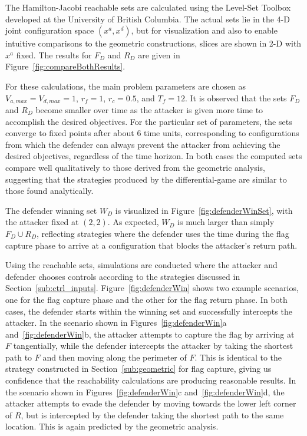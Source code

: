 \documentclass[letterpaper, 10 pt, conference]{ieeeconf}  %
\numberwithin{algorithm}{section}
\begin{document}
The Hamilton-Jacobi reachable sets are calculated using the Level-Set Toolbox~\cite{LSToolbox} developed at the University of British Columbia.  The actual sets lie in the 4-D joint configuration space $(x^a,x^d)$, but for visualization and also to enable intuitive comparisons to the geometric constructions, slices are shown in 2-D with $x^a$ fixed.  The results for $F_D$ and $R_D$ are given in Figure~\ref{fig:compareBothResults}.

For these calculations, the main problem parameters are chosen as $V_{a,max}=V_{d,max}=1$, $r_f = 1$, $r_c = 0.5$, and $T_f = 12$.  It is observed that the sets $F_D$ and $R_D$ become smaller over time as the attacker is given more time to accomplish the desired objectives.  For the particular set of parameters, the sets converge to fixed points after about 6 time units, corresponding to configurations from which the defender can always prevent the attacker from achieving the desired objectives, regardless of the time horizon.  In both cases the computed sets compare well qualitatively to those derived from the geometric analysis, suggesting that the strategies produced by the differential-game are similar to those found analytically.  

The defender winning set $W_D$ is visualized in Figure~\ref{fig:defenderWinSet}, with the attacker fixed at $(2,2)$.  As expected, $W_D$ is much larger than simply $F_D \cup R_D$, reflecting strategies where the defender uses the time during the flag capture phase to arrive at a configuration that blocks the attacker's return path.

Using the reachable sets, simulations are conducted where the attacker and defender chooses controls according to the strategies discussed in Section~\ref{sub:ctrl_inputs}.  Figure~\ref{fig:defenderWin} shows two example scenarios, one for the flag capture phase and the other for the flag return phase.  In both cases, the defender starts within the winning set and successfully intercepts the attacker.  In the scenario shown in Figures~\ref{fig:defenderWin}a and~\ref{fig:defenderWin}b, the attacker attempts to capture the flag by arriving at $F$ tangentially, while the defender intercepts the attacker by taking the shortest path to $F$ and then moving along the perimeter of $F$.  This is identical to the strategy constructed in Section~\ref{sub:geometric} for flag capture, giving us confidence that the reachability calculations are producing reasonable results.  In the scenario shown in Figures~\ref{fig:defenderWin}c and~\ref{fig:defenderWin}d, the attacker attempts to evade the defender by moving towards the lower left corner of $R$, but is intercepted by the defender taking the shortest path to the same location.  This is again predicted by the geometric analysis.
\end{document}
